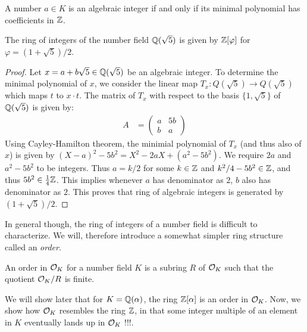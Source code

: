 \documentclass[11pt]{article}
\begin{document}
\begin{lemma}\label{lem:min-poly}
A number $a\in K$ is an algebraic integer if and only if its minimal polynomial has coefficients in $\mathbb{Z}$.
\end{lemma}

\begin{example}\label{ex:q-root-5}
The ring of integers of the number field $\mathbb{Q}(\sqrt{5})$ is given by $\mathbb{Z}[\varphi]$ for $\varphi=(1+\sqrt{5})/2$.
\end{example}
\begin{proof}
Let $x=a+b\sqrt{5}\in \mathbb{Q}(\sqrt{5})$ be an algebraic integer. To determine the minimal polynomial of $x$, we
consider the linear map $T_x: Q(\sqrt{5})\rightarrow Q(\sqrt{5})$ which maps $t$ to $x\cdot t$. The matrix
of $T_x$ with respect to the basis $\{1, \sqrt{5}\}$ of $\mathbb{Q}(\sqrt{5})$ is given by:
\begin{align*}
A &= \begin{pmatrix}
        a & 5b \\
        b & a
    \end{pmatrix}
\end{align*}
Using Cayley-Hamilton theorem, the minimial polynomial of $T_x$ (and thus also of $x$) is given by
$(X-a)^2 - 5b^2= X^2 -2aX + (a^2 - 5b^2)$. We require $2a$ and $a^2 - 5b^2$ to be integers. Thus
$a=k/2$ for some $k\in \mathbb{Z}$ and $k^2/4 - 5b^2\in \mathbb{Z}$, and thus $5b^2\in \frac{1}{4}\mathbb{Z}$. This implies whenever
$a$ has denominator as $2$, $b$ also has denominator as $2$. This proves that ring of algebraic integers
is generated by $(1+\sqrt{5})/2$.
\end{proof}

In general though, the ring of integers of a number field is difficult to characterize. We will, therefore
introduce a somewhat simpler ring structure called an {\em order}.

\begin{definition}[Order]\label{defn:order}
An order in $\mathcal{O}_{K}$ for a number field $K$ is a subring $R$ of $\mathcal{O}_{K}$ such that the quotient $\mathcal{O}_{K}/R$
is finite.
\end{definition}
We will show later that for $K=\mathbb{Q}(\alpha)$, the ring $\mathbb{Z}[\alpha]$ is an order in $\mathcal{O}_{K}$. Now, we show
how $\mathcal{O}_{K}$ resembles the ring $\mathbb{Z}$, in that some integer multiple of an element in $K$ eventually lands
up in $\mathcal{O}_{K}$ !!!.
\end{document}
